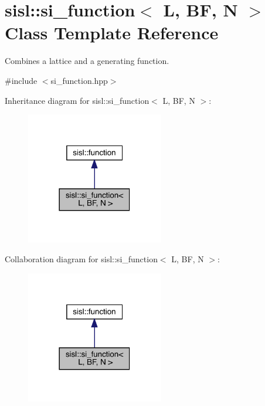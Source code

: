 \hypertarget{classsisl_1_1si__function}{}\section{sisl\+:\+:si\+\_\+function$<$ L, BF, N $>$ Class Template Reference}
\label{classsisl_1_1si__function}


Combines a lattice and a generating function.  




{\ttfamily \#include $<$si\+\_\+function.\+hpp$>$}



Inheritance diagram for sisl\+:\+:si\+\_\+function$<$ L, BF, N $>$\+:\nopagebreak
\begin{figure}[H]
\begin{center}
\leavevmode
\includegraphics[width=170pt]{classsisl_1_1si__function__inherit__graph}
\end{center}
\end{figure}


Collaboration diagram for sisl\+:\+:si\+\_\+function$<$ L, BF, N $>$\+:\nopagebreak
\begin{figure}[H]
\begin{center}
\leavevmode
\includegraphics[width=170pt]{classsisl_1_1si__function__coll__graph}
\end{center}
\end{figure}
